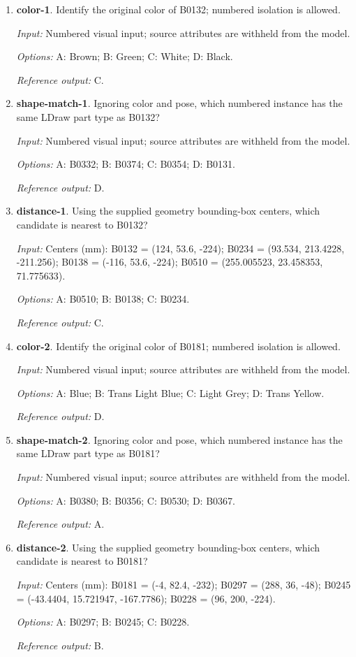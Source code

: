 \begin{enumerate}
\item \textbf{color-1}. Identify the original color of B0132; numbered isolation is allowed.\par {\small \textit{Input:} Numbered visual input; source attributes are withheld from the model. \par\textit{Options:} A: Brown; B: Green; C: White; D: Black. \par\textit{Reference output:} C.}
\item \textbf{shape-match-1}. Ignoring color and pose, which numbered instance has the same LDraw part type as B0132?\par {\small \textit{Input:} Numbered visual input; source attributes are withheld from the model. \par\textit{Options:} A: B0332; B: B0374; C: B0354; D: B0131. \par\textit{Reference output:} D.}
\item \textbf{distance-1}. Using the supplied geometry bounding-box centers, which candidate is nearest to B0132?\par {\small \textit{Input:} Centers (mm): B0132 = (124, 53.6, -224); B0234 = (93.534, 213.4228, -211.256); B0138 = (-116, 53.6, -224); B0510 = (255.005523, 23.458353, 71.775633). \par\textit{Options:} A: B0510; B: B0138; C: B0234. \par\textit{Reference output:} C.}
\item \textbf{color-2}. Identify the original color of B0181; numbered isolation is allowed.\par {\small \textit{Input:} Numbered visual input; source attributes are withheld from the model. \par\textit{Options:} A: Blue; B: Trans Light Blue; C: Light Grey; D: Trans Yellow. \par\textit{Reference output:} D.}
\item \textbf{shape-match-2}. Ignoring color and pose, which numbered instance has the same LDraw part type as B0181?\par {\small \textit{Input:} Numbered visual input; source attributes are withheld from the model. \par\textit{Options:} A: B0380; B: B0356; C: B0530; D: B0367. \par\textit{Reference output:} A.}
\item \textbf{distance-2}. Using the supplied geometry bounding-box centers, which candidate is nearest to B0181?\par {\small \textit{Input:} Centers (mm): B0181 = (-4, 82.4, -232); B0297 = (288, 36, -48); B0245 = (-43.4404, 15.721947, -167.7786); B0228 = (96, 200, -224). \par\textit{Options:} A: B0297; B: B0245; C: B0228. \par\textit{Reference output:} B.}

\end{enumerate}
